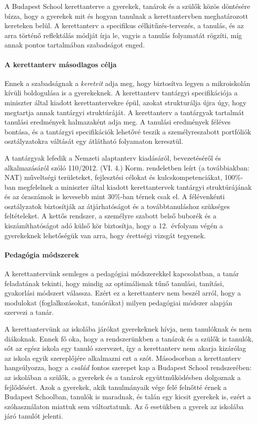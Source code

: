 A Budapest School kerettanterve a gyerekek, tanárok és a szülők közös döntésére bízza, hogy a gyerekek mit és hogyan tanulnak a kerettantervben meghatározott kereteken belül. A kerettanterv a specifikus célkitűzés-tervezés, a tanulás, és az arra történő reflektálás módját írja le, vagyis a tanulás folyamatát rögzíti, míg annak pontos tartalmában szabadságot enged.

\paragraph{A kerettanterv másodlagos célja}  Ennek a szabadságnak
a \emph{kereteit} adja\linebreak
meg, hogy biztosítva legyen a mikroiskolán kívüli boldogulása is a gyerekeknek. A kerettanterv
 tantárgyi specifikációja a miniszter által kiadott kerettantervekre \citep{ofi:kerettanterv} épül, azokat strukturálja újra úgy, hogy megtartja annak tantárgyi struktúráját. A kerettanterv a tantárgyak tartalmát tanulási eredmények halmazaként adja meg. A tanulási eredmények féléves bontása, és a tantárgyi specifikációk lehetővé teszik a személyreszabott portfóliók osztályzatokra váltását egy átlátható folyamaton keresztül.

A tantárgyak lefedik a Nemzeti alaptanterv kiadásáról, bevezetéséről és alkalmazásáról szóló 110/2012. (VI. 4.) Korm. rendeletben leírt (a továbbiakban: NAT) műveltségi területeket, fejlesztési célokat és kulcskompetenciákat, 100\%-ban megfelelnek a miniszter által kiadott kerettantervek tantárgyi struktúrájának és az óraszámok is kevesebb mint 30\%-ban térnek csak el. A félévenkénti osztályzatok biztosítják az átjárhatóságot és a továbbtanuláshoz szükséges feltételeket. A kettős rendszer, a személyre szabott belső buborék és a kiszámíthatóságot adó külső kör biztosítja, hogy a 12.~évfolyam végén a gyerekeknek lehetőségük van arra, hogy érettségi vizsgát tegyenek.

\paragraph{Pedagógia módszerek}
A kerettantervünk semleges a pedagógiai módszerekkel kapcsolatban, a tanár feladatának tekinti, hogy mindig az optimálisnak tűnő tanulási, tanítási, gyakorlási módszert válassza. Ezért ez a kerettanterv nem beszél arról, hogy a modulokat (foglalkozásokat, tanórákat) milyen pedagógiai módszer alapján szervezi a tanár.

A kerettantervünk az iskolába járókat gyerekeknek hívja, nem tanulóknak és nem diákoknak. Ennek fő oka, hogy a rendszerünkben a tanárok és a szülők is tanulók, sőt az egész iskola egy tanuló szervezet, így a kerettanterv nem akarja  kizárólag az iskola egyik szereplőjére alkalmazni ezt a szót. Másodsorban a kerettanterv hangsúlyozza, hogy a \emph{család} fontos szerepet kap a Budapest School rendszerében: az iskolában a szülők, a gyerekek és a tanárok együttműködésben dolgoznak a fejlődésért. Azok a gyerekek, akik tanulmányaik vége felé felnőtté érnek a Budapest Schoolban, tanulók is maradnak, és talán egy kicsit gyerekek is, ezért a szóhasználaton miattuk sem változtatunk. Az ő esetükben a gyerek az iskolába járó tanulót jelenti.


